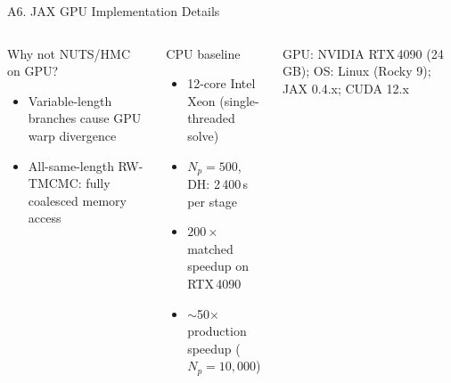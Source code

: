 \documentclass[aspectratio=169,10pt,t]{beamer}
\begin{document}
\begin{frame}[t]{A6. JAX GPU Implementation Details}
\begin{columns}[T]
\begin{block}{Why not NUTS/HMC on GPU?}
\begin{itemize}
          \item Variable-length branches cause GPU warp divergence
          \item All-same-length RW-TMCMC: fully coalesced memory access
        \end{itemize}
      \end{block}
      \vspace{5pt}
      \begin{block}{CPU baseline}
        \begin{itemize}\setlength{\itemsep}{1pt}
          \item 12-core Intel Xeon (single-threaded solve)
          \item $N_p=500$, DH: 2\,400\,s per stage
          \item $200\times$ matched speedup on RTX\,4090
          \item $\sim$50$\times$ production speedup ($N_p=10{,}000$)
        \end{itemize}
      \end{block}
      \vspace{4pt}
      {\scriptsize\color{midgray}
       GPU: NVIDIA RTX\,4090 (24\,GB);\;
       OS: Linux (Rocky 9);\;
       JAX 0.4.x;\;
       CUDA 12.x}
  \end{columns}
\end{frame}

\end{document}

